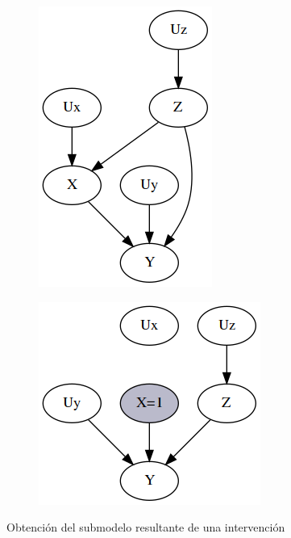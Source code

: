 \begin{figure}[h!]
	\centering
	\begin{subfigure}[b]{0.48\linewidth}
		\centering
		\includegraphics[width=0.65\linewidth]{images/Chapter 2/intervention-example(1).png}
		\caption{}
		\label{fig:int-ex:a}
	\end{subfigure}
	\begin{subfigure}[b]{0.48\linewidth}
		\centering
		\includegraphics[width=0.8\linewidth]{images/Chapter 2/intervention-example(2).png}
		\caption{}
		\label{fig:int-ex:b}
	\end{subfigure}
	\caption{Obtención del submodelo resultante de una intervención}
	\label{fig:int-ex}
\end{figure}  

